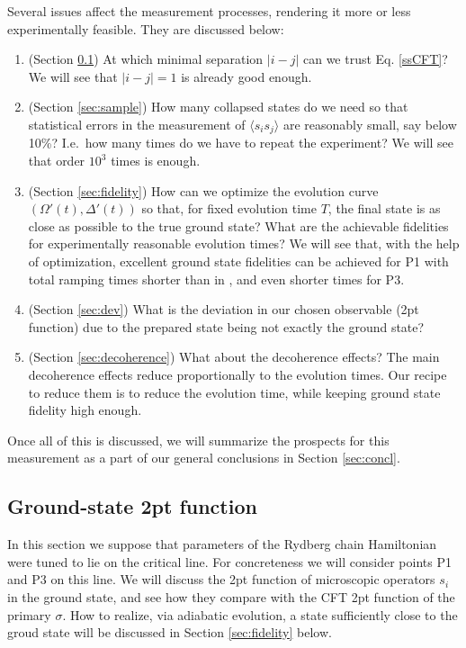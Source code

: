 \documentclass[a4paper,11pt]{article}
\theoremstyle{remark}
\theoremstyle{theorem}
\begin{document}
Several issues affect the measurement processes, rendering it more or less
experimentally feasible. They are discussed below:
\begin{enumerate}
	\item (Section \ref{sec:2ptDMRG}) At which minimal separation $| i - j |$
	can we trust Eq. \eqref{ssCFT}? We will see that $| i - j | = 1$ is already
	good enough.
	
	\item (Section \ref{sec:sample}) How many collapsed states do we need so
	that statistical errors in the measurement of $\langle s_i s_j \rangle$ are
	reasonably small, say below 10\%? I.e.~how many times do we have to repeat the
	experiment? We will see that order $10^3$ times is enough.
	
	\item (Section \ref{sec:fidelity}) How can we optimize the evolution curve
	$(\Omega' (t), \Delta' (t))$ so that, for fixed evolution time $T$, the
	final state is as close as possible to the true ground state? What are the
	achievable fidelities for experimentally reasonable evolution times? We will
	see that, with the help of optimization, excellent ground state fidelities
	can be achieved for P1 with total ramping times shorter than in
	{\cite{Fang:2024uyf}}, and even shorter times for P3.
	
	\item (Section \ref{sec:dev}) What is the deviation in our chosen observable (2pt function) due to the prepared state being not exactly the ground state?
	
	\item (Section \ref{sec:decoherence}) What about the decoherence effects?
	The main decoherence effects reduce proportionally to the evolution times.
	Our recipe to reduce them is to reduce the evolution time, while keeping
	ground state fidelity high enough.
\end{enumerate}
Once all of this is discussed, we will summarize the prospects for this measurement as a part of our general conclusions
in Section \ref{sec:concl}.

\subsection{Ground-state 2pt function}\label{sec:2ptDMRG}

In this section we suppose that parameters of the Rydberg chain Hamiltonian
were tuned to lie on the critical line. For concreteness we will consider
points P1 and P3 on this line. We will discuss the 2pt function of microscopic
operators $s_i$ in the ground state, and see how they compare with the CFT 2pt
function of the primary $\sigma$. How to realize, via adiabatic evolution, a
state sufficiently close to the groud state will be discussed in Section
\ref{sec:fidelity} below.
\end{document}
